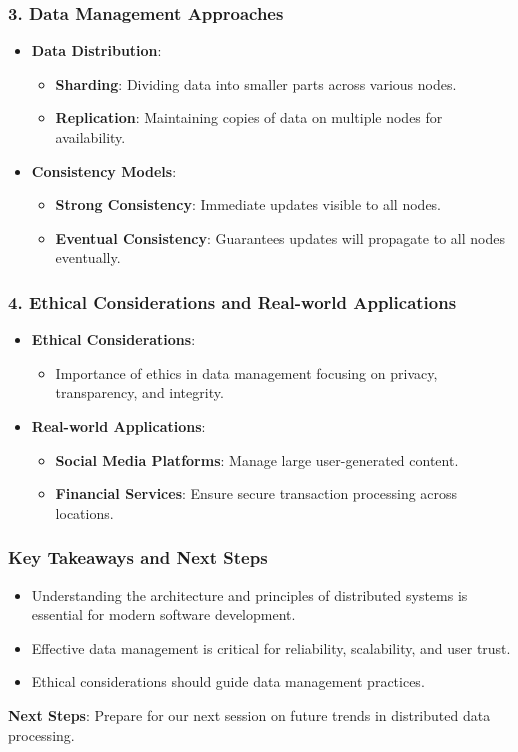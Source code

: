 \documentclass[aspectratio=169]{beamer}
\begin{document}
\begin{frame}[fragile]
  \frametitle{3. Data Management Approaches}
  \begin{itemize}
    \item \textbf{Data Distribution}:
      \begin{itemize}
        \item \textbf{Sharding}: Dividing data into smaller parts across various nodes.
        \item \textbf{Replication}: Maintaining copies of data on multiple nodes for availability.
      \end{itemize}
    \item \textbf{Consistency Models}:
      \begin{itemize}
        \item \textbf{Strong Consistency}: Immediate updates visible to all nodes.
        \item \textbf{Eventual Consistency}: Guarantees updates will propagate to all nodes eventually.
      \end{itemize}
  \end{itemize}
\end{frame}

\begin{frame}[fragile]
  \frametitle{4. Ethical Considerations and Real-world Applications}
  \begin{itemize}
    \item \textbf{Ethical Considerations}:
      \begin{itemize}
        \item Importance of ethics in data management focusing on privacy, transparency, and integrity.
      \end{itemize}
    \item \textbf{Real-world Applications}:
      \begin{itemize}
        \item \textbf{Social Media Platforms}: Manage large user-generated content.
        \item \textbf{Financial Services}: Ensure secure transaction processing across locations.
      \end{itemize}
  \end{itemize}
\end{frame}

\begin{frame}[fragile]
  \frametitle{Key Takeaways and Next Steps}
  \begin{itemize}
    \item Understanding the architecture and principles of distributed systems is essential for modern software development.
    \item Effective data management is critical for reliability, scalability, and user trust.
    \item Ethical considerations should guide data management practices.
  \end{itemize}
  \textbf{Next Steps}: Prepare for our next session on future trends in distributed data processing.
\end{frame}
\end{document}
